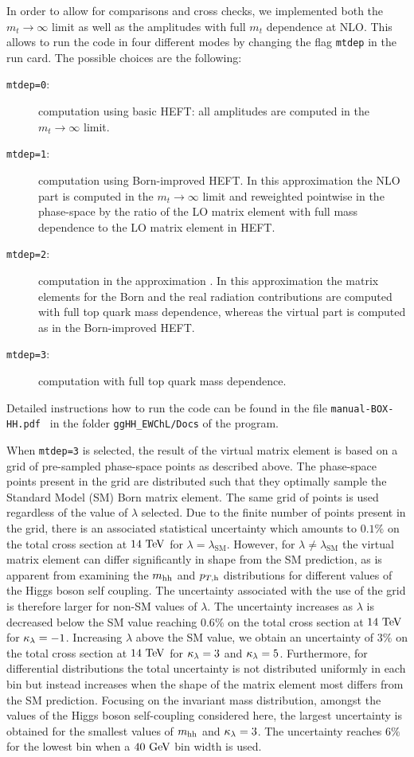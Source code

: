 In order to allow for comparisons and cross checks, we implemented
both the $m_t\to\infty$ limit as well as the  amplitudes with full $m_t$ dependence at
NLO. This allows to run the code in four different modes by changing
the flag {\tt mtdep} in the \powhegbox{} run card. The possible
choices are the following:
\begin{description}
 \item[{\tt mtdep=0}:]{computation using basic HEFT: all amplitudes
   are computed in the $m_t\to\infty$ limit.}
\item[{\tt mtdep=1}:]{computation using Born-improved HEFT. In this
   approximation the NLO part is computed in the $m_t\to\infty$ limit
   and reweighted pointwise in the phase-space by the ratio of the LO matrix
   element with full mass dependence to  the LO matrix
   element in HEFT.}
 \item[{\tt mtdep=2}:]{computation in the approximation \ftapprox. In
   this approximation the matrix elements for the Born and the real
   radiation contributions are computed with full top quark mass dependence, whereas the virtual part is
   computed as in the Born-improved HEFT. }
 \item[{\tt mtdep=3}:]{computation with full top quark mass dependence.}
\end{description}
Detailed instructions how to run the code can be found in the
file {\tt manual-BOX-HH.pdf } in the folder {\tt ggHH\_EWChL/Docs} of the program.

When {\tt mtdep=3} is selected, the result of the virtual matrix element is based on a grid of pre-sampled phase-space points as described above. The phase-space points present in the grid are distributed such that they optimally sample the Standard Model (SM) Born matrix element. The same grid of points is used regardless of the value of $\lambda$ selected. Due to the finite number of points present in the grid, there is an associated statistical uncertainty which amounts to $0.1\%$ on the total cross section at $14\ \TeV$ for $\lambda=\lambda_\mathrm{SM}$. However, for $\lambda \neq \lambda_\mathrm{SM}$ the virtual matrix element can differ significantly in shape from the SM prediction, as is apparent from examining the $m_{\mathrm{hh}}$ and $p_{T,\mathrm{h}}$ distributions for different values of the Higgs boson self coupling. The uncertainty associated with the use of the grid is therefore larger for non-SM values of $\lambda$. The uncertainty increases as $\lambda$ is decreased below the SM value reaching $0.6\%$ on the total cross section at $14\ \TeV$ for $\kappa_{\lambda} = -1$. Increasing $\lambda$ above the SM value, we obtain an uncertainty of $3\%$ on the total cross section at $14\ \TeV$ for $\kappa_{\lambda} = 3$ and  $\kappa_{\lambda} = 5$. Furthermore, for differential distributions the total uncertainty is not distributed uniformly in each bin but instead increases when the shape of the matrix element most differs from the SM prediction. Focusing on the invariant mass distribution, amongst the values of the Higgs boson self-coupling considered here, the largest uncertainty is obtained for the smallest values of $m_{\mathrm{hh}}$ and $\kappa_{\lambda}=3$. The uncertainty reaches $6\%$ for the lowest bin when a $40\ \mathrm{GeV}$ bin width is used.
